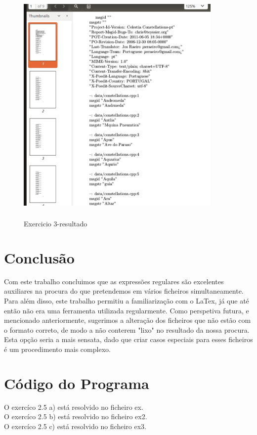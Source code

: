 \documentclass{report}
\begin{document}
\begin{figure}[h]
\centering
\includegraphics[width=10cm,height= 12cm]{exercicio32.png}
\caption{Exercicio 3-resultado}
\label{Exercicio 3}
\end{figure}


\chapter{Conclusão} \label{concl}
Com este trabalho concluimos que as expressões regulares são excelentes auxiliares na procura do que pretendemos em vários ficheiros simultaneamente.
Para além disso, este trabalho permitiu a familiarização com o LaTex, já que até então não era uma ferramenta utilizada regularmente.
Como perspetiva futura, e mencionado anteriormente, sugerimos a alteração dos ficheiros que não estão com o formato correto, de modo a não conterem "lixo" no resultado da nossa procura. Esta opção seria a mais sensata, dado que criar casos especiais para esses ficheiros é um procedimento mais complexo.



\chapter{Código do Programa}

O exercíco 2.5 a) está resolvido no ficheiro ex.\\
O exercíco 2.5 b) está resolvido no ficheiro ex2.\\
O exercíco 2.5 c) está resolvido no ficheiro ex3.\\
\end{document}
